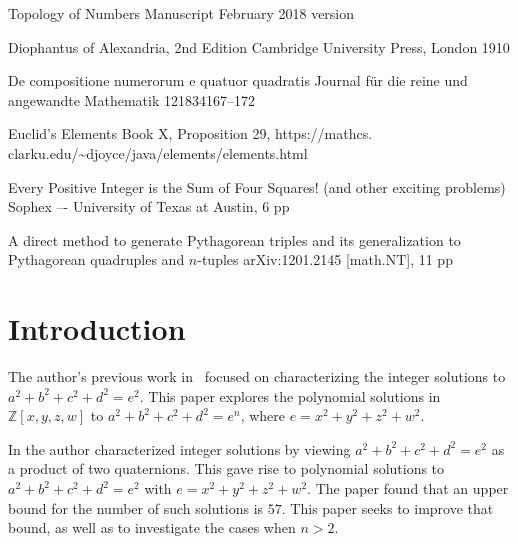 \documentclass[12pt,table]{article}
\theoremstyle{definition}
\theoremstyle{remark}
\newcommand{\Zzz}{\mathbb Z}
\numberwithin{equation}{section}
\begin{document}
\begin{thebibliography}{1}
         {Topology of Numbers}
         {Manuscript}
         {February 2018 version}



     {Diophantus of Alexandria, 2nd Edition}
     {Cambridge University Press, London}
     {1910}

        {De compositione numerorum e quatuor quadratis}
        {Journal f\"ur die reine und angewandte Mathematik}
        {12}{1834}{167--172}


        {Euclid's Elements}
        {Book X, Proposition 29, https://mathcs.
        clarku.edu/\~{}djoyce/java/elements/elements.html}


      {Every Positive Integer is the Sum of Four Squares! (and other
      exciting problems)} 
      {Sophex –- University of Texas at Austin, 6
      pp}{}


      {A direct method to generate Pythagorean triples and its
       generalization to Pythagorean quadruples and $n$-tuples}
      {arXiv:1201.2145 [math.NT], 11 pp}





\end{thebibliography}







\section{Introduction}


The author's previous work in~\cite{Ehrenborg_2018}
focused on characterizing the
integer solutions to
$a^2 + b^2 + c^2 + d^2 = e^2$.
This paper explores the polynomial solutions
in $ \Zzz[x,y,z,w] $ to
$a^2 + b^2 + c^2 + d^2 = e^n$, where
$e = x^2 + y^2 + z^2 + w^2$.

In \cite{Ehrenborg_2018} the author characterized integer
solutions by viewing $a^2 + b^2 + c^2 + d^2 = e^2$
as a product of two quaternions. This gave
rise to polynomial solutions to
$a^2 + b^2 + c^2 + d^2 = e^2$
with $e = x^2 + y^2 + z^2 + w^2$.
The paper found that an upper bound for the number
of such solutions is $57$. This paper seeks to
improve that bound, as well as to investigate
the cases when $n > 2$.
\end{document}

